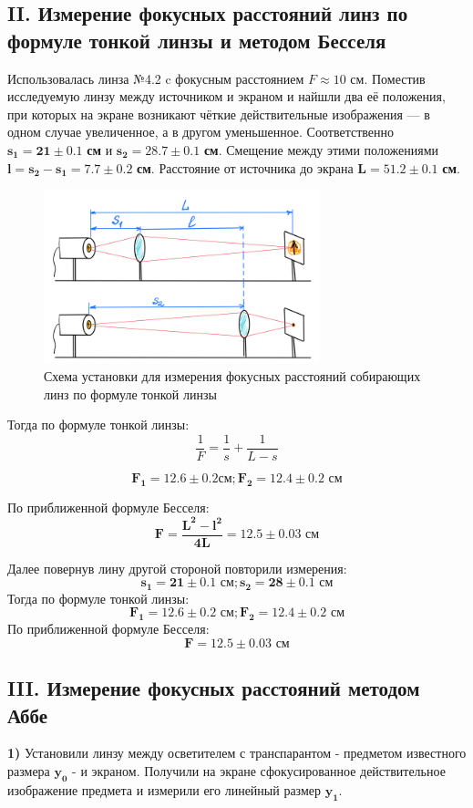 \subsection*{II. Измерение фокусных расстояний линз по формуле тонкой линзы и
методом Бесселя}
Использовалась линза №4.2 c фокусным расстоянием $F \approx 10$ {см}.
Поместив исследуемую линзу между источником и экраном и найшли два её
положения, при которых на экране возникают чёткие действительные изображения
— в одном случае увеличенное, а в другом уменьшенное. Соответственно $\bm{s_1 = 21\pm0.1}$ \textbf{см} и $\bm{s_2 = 28.7 \pm 0.1}$ \textbf{см}. Смещение между этими положениями $\bm{l = s_2 - s_1 = 7.7 \pm 0.2}$ \textbf{см}. Расстояние от источника до экрана $\bm{L = 51.2 \pm 0.1}$ \textbf{см}.
\begin{figure}[h!]
    \centering
    \includegraphics[width=8cm]{images/setup2.png}
    \caption{Схема установки для измерения фокусных расстояний собирающих линз по формуле тонкой линзы}
\end{figure}
Тогда по формуле тонкой линзы:
\begin{equation}
    \frac{1}{F} = \frac{1}{s} + \frac{1}{L - s}
\end{equation}

$$\bm{F_1 = 12.6\pm 0.2 \textbf{см}; F_2 = 12.4\pm0.2 \textbf{ см}}$$

По приближенной формуле Бесселя:
\begin{equation}
    \bm{F = \frac{L^2 - l^2}{4L} = 12.5 \pm 0.03} \textbf{ см}
\end{equation}

Далее повернув лину другой стороной повторили измерения:
$$\bm{s_1 = 21 \pm 0.1 \textbf{ см}; s_2 = 28 \pm 0.1 \textbf{ см}} $$
Тогда по формуле тонкой линзы:
$$\bm{F_1 = 12.6 \pm 0.2 \textbf{ см}; F_2 = 12.4 \pm 0.2 \textbf{ см}} $$
По приближенной формуле Бесселя:
$$\bm{F = 12.5 \pm 0.03 \textbf{ см}}$$

\newpage{}
\subsection*{III. Измерение фокусных расстояний методом Аббе}
\textbf{1)} Установили линзу между осветителем с транспарантом - предметом известного размера $\bm{y_0}$ - и экраном. Получили на экране сфокусированное действительное изображение предмета и измерили его линейный размер $\bm{y_1}$.\\ 

